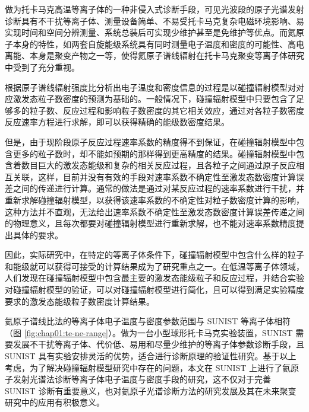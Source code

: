 做为托卡马克高温等离子体的一种非侵入式诊断手段，可见光波段的原子光谱发射诊断具有不干扰等离子体、测量设备简单、不易受托卡马克复杂电磁环境影响、易实现时间和空间分辨测量、系统总装后可实现少维护甚至是免维护等优点。而氦原子本身的特性，如两套自旋能级系统具有同时测量电子温度和密度的可能性、高电离能、本身是聚变产物之一等，使得氦原子谱线辐射在托卡马克聚变等离子体研究中受到了充分重视。

根据原子谱线辐射强度比分析出电子温度和密度信息的过程是以碰撞辐射模型对对应激发态粒子数密度的预测为基础的。一般情况下，碰撞辐射模型中只要包含了足够多的粒子数、反应过程和影响粒子数密度的其它相关效应，通过对各粒子数密度反应速率方程进行求解，即可以获得精确的能级数密度结果。

但是，由于现阶段原子反应过程速率系数的精度得不到保证，在碰撞辐射模型中包含更多的粒子数时，却不能如预期的那样得到更高精度的结果。碰撞辐射模型中包含着数目巨大的激发态能级和复杂的相关反应过程，且各粒子之间通过原子反应相互关联，这样，目前并没有有效的手段对速率系数不确定性至激发态数密度计算误差之间的传递进行计算。通常的做法是通过对某反应过程的速率系数进行干扰，并重新求解碰撞辐射模型，以获得该速率系数的不确定性对粒子数密度计算的影响，这种方法并不直观，无法给出速率系数不确定性至激发态数密度计算误差传递之间的物理意义，且每次都要对碰撞辐射模型进行重新求解，也不能对速率系数精度提出具体的要求。

因此，实际研究中，在特定的等离子体条件下，碰撞辐射模型中包含什么样的粒子和能级就可以获得可接受的计算结果成为了研究重点之一。在低温等离子体领域，人们发现在碰撞辐射模型中包含最主要的激发态能级粒子和反应过程，并结合实验对碰撞辐射模型的验证，可以对碰撞辐射模型进行简化，且可以得到满足实验精度要求的激发态能级粒子数密度计算结果。


氦原子谱线比法的等离子体电子温度与密度参数范围与 SUNIST 等离子体相符（图 \ref{fig:chap01:te-ne-range}）。做为一台小型球形托卡马克实验装置，SUNIST 需要发展不干扰等离子体、代价低、易用和尽量少维护的等离子体参数诊断手段，且 SUNIST 具有实验安排灵活的优势，适合进行诊断原理的验证性研究。基于以上考虑，为了解决碰撞辐射模型研究中存在的问题，本文在 SUNIST 上进行了氦原子发射光谱法诊断等离子体电子温度与密度手段的研究，这不仅对于完善 SUNIST 诊断有重要意义，也对氦原子光谱诊断方法的研究发展及其在未来聚变研究中的应用有积极意义。

